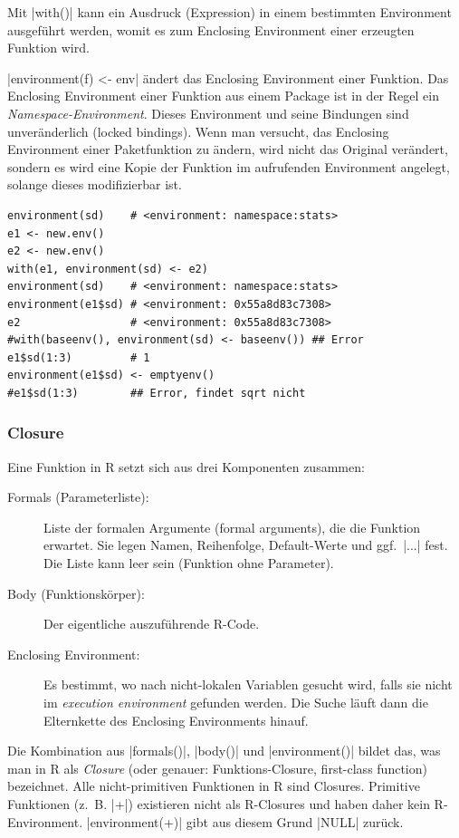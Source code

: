 \documentclass[10pt,twocolumn]{scrartcl}
\renewcommand{\lstinline}{\mycoloredinline}
\begin{document}
Mit \lstinline|with()| kann ein Ausdruck (Expression) in einem bestimmten Environment ausgeführt werden, womit es zum Enclosing Environment einer erzeugten Funktion wird.

\lstinline|environment(f) <- env| ändert das Enclosing Environment einer Funktion. Das Enclosing Environment einer Funktion aus einem Package ist in der Regel ein \emph{Namespace-Environment}. Dieses Environment und seine Bindungen sind unveränderlich (locked bindings). Wenn man versucht, das Enclosing Environment einer Paketfunktion zu ändern, wird nicht das Original verändert, sondern es wird eine Kopie der Funktion im aufrufenden Environment angelegt, solange dieses modifizierbar ist.

\begin{lstlisting}
environment(sd)    # <environment: namespace:stats>
e1 <- new.env()
e2 <- new.env()
with(e1, environment(sd) <- e2)
environment(sd)    # <environment: namespace:stats>
environment(e1$sd) # <environment: 0x55a8d83c7308>
e2                 # <environment: 0x55a8d83c7308>
#with(baseenv(), environment(sd) <- baseenv()) ## Error
e1$sd(1:3)         # 1
environment(e1$sd) <- emptyenv()
#e1$sd(1:3)        ## Error, findet sqrt nicht
\end{lstlisting}


\subsubsection{Closure}

Eine Funktion in R setzt sich aus drei Komponenten zusammen:

\begin{description}
\item[Formals (Parameterliste):] Liste der formalen Argumente (formal arguments), die die Funktion erwartet. Sie legen Namen, Reihenfolge, Default-Werte und ggf.\ \lstinline|...| fest. Die Liste kann leer sein (Funktion ohne Parameter).
\item[Body (Funktionskörper):] Der eigentliche auszuführende R-Code.
\item[Enclosing Environment:] Es bestimmt, wo nach nicht-lokalen Variablen gesucht wird, falls sie nicht im \emph{execution environment} gefunden werden. Die Suche läuft dann die Elternkette des Enclosing Environments hinauf.
\end{description}

Die Kombination aus \lstinline|formals()|, \lstinline|body()| und \lstinline|environment()| bildet das, was man in R als \emph{Closure} (oder genauer: Funktions-Closure, first-class function) bezeichnet.
Alle nicht-primitiven Funktionen in R sind Closures. Primitive Funktionen (z.~B. \lstinline|+|) existieren nicht als R-Closures und haben daher kein R-Environment. \lstinline|environment(+)| gibt aus diesem Grund \lstinline|NULL| zurück.
\end{document}
